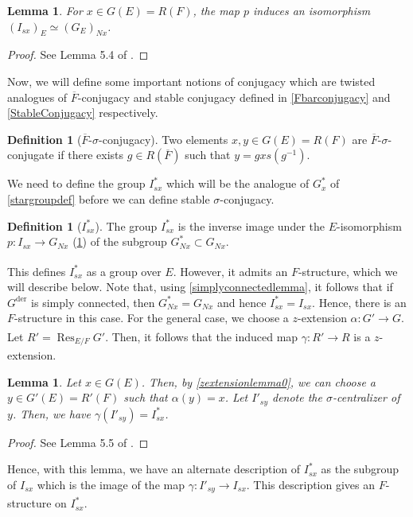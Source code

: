 \documentclass[11pt,a4paper]{article}
\theoremstyle{definition}
\newtheorem{D}[shared]{Definition}
\theoremstyle{plain}
\newtheorem{Le}[shared]{Lemma}
\theoremstyle{remark}
\theoremstyle{plain}
\DeclareMathOperator{\Res}{Res}
\begin{document}
\begin{Le}\label{twistedlemma}
    For $x \in G(E) = R(F)$, the map $p$ induces an isomorphism $(I_{sx})_E \simeq (G_E)_{Nx}$.
\end{Le}
\begin{proof}
    See Lemma 5.4 of \cite{MR683003}.
\end{proof}


Now, we will define some important notions of conjugacy which are twisted analogues of $\overline{F}$-conjugacy and stable conjugacy defined in \ref{Fbarconjugacy} and \ref{StableConjugacy} respectively.

\begin{D}[$\overline{F}$-$\sigma$-conjugacy]
    Two elements $x,y \in G(E) = R(F)$ are $\overline{F}$-$\sigma$-conjugate if there exists $g \in R(\overline{F})$ such that $y = gxs(g^{-1})$.
\end{D}

We need to define the group $I_{sx}^*$ which will be the analogue of $G_x^*$ of \ref{stargroupdef} before we can define stable $\sigma$-conjugacy.

\begin{D}[$I_{sx}^*$]
    The group $I_{sx}^*$ is the inverse image under the $E$-isomorphism $p: I_{sx} \xrightarrow[]{} G_{Nx}$ (\ref{twistedlemma}) of the subgroup $G_{Nx}^* \subset G_{Nx}$.
\end{D}

This defines $I_{sx}^*$ as a group over $E$. However, it admits an $F$-structure, which we will describe below. Note that, using \ref{simplyconnectedlemma}, it follows that if $G^{\text{der}}$ is simply connected, then $G_{Nx}^* = G_{Nx}$ and hence $I_{sx}^* = I_{sx}$. Hence, there is an $F$-structure in this case. For the general case, we choose a $z$-extension $\alpha: G' \xrightarrow[]{} G$. Let $R' = \Res_{E/F}G'$. Then, it follows that the induced map $\gamma: R' \xrightarrow[]{} R$ is a $z$-extension.

\begin{Le}
    Let $x \in G(E)$. Then, by \ref{zextensionlemma0}, we can choose a $y \in G'(E) = R'(F)$ such that $\alpha(y) = x$. Let $I'_{sy}$ denote the $\sigma$-centralizer of $y$. Then, we have $\gamma(I'_{sy}) = I_{sx}^*$.
\end{Le}
\begin{proof}
    See Lemma 5.5 of \cite{MR683003}.
\end{proof}

Hence, with this lemma, we have an alternate description of $I_{sx}^*$ as the subgroup of $I_{sx}$ which is the image of the map $\gamma: I'_{sy} \xrightarrow[]{} I_{sx}$. This description gives an $F$-structure on $I_{sx}^*$.
\end{document}
